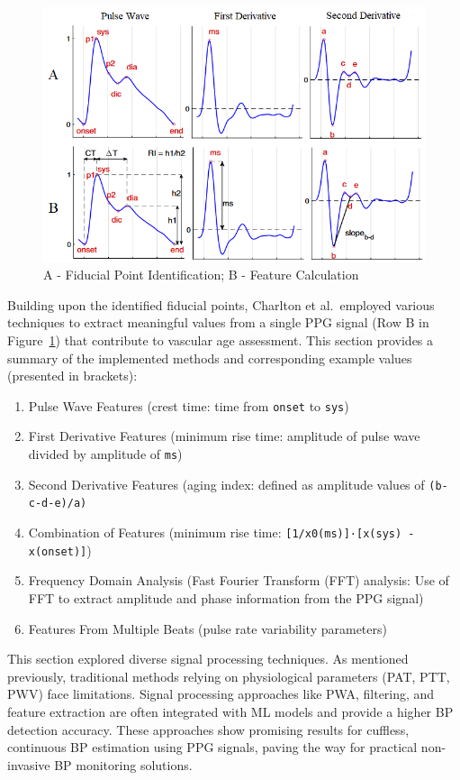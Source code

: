\begin{figure}[h]
    \centering
    \includegraphics[scale=0.8]{images/sp/fiducials}
    \caption{A - Fiducial Point Identification; B - Feature Calculation~\cite{charltonAssessingHemodynamicsPhotoplethysmogram2022}}
    \label{fig:fiducials}
\end{figure}

Building upon the identified fiducial points, Charlton et al.\ employed various techniques to extract meaningful values from a single PPG signal (Row B in Figure~\ref{fig:fiducials}) that contribute to vascular age assessment.
This section provides a summary of the implemented methods and corresponding example values (presented in brackets):
\begin{enumerate}
    \item Pulse Wave Features (crest time: time from \texttt{onset} to \texttt{sys})
    \item First Derivative Features (minimum rise time: amplitude of pulse wave divided by amplitude of \texttt{ms})
    \item Second Derivative Features (aging index: defined as amplitude values of \mbox{\texttt{(b-c-d-e)/a)}}
    \item Combination of Features (minimum rise time: \texttt{[1/x0(ms)]·[x(sys) - x(onset)]})
    \item Frequency Domain Analysis (Fast Fourier Transform (FFT) analysis: Use of FFT to extract amplitude and phase information from the PPG signal)
    \item Features From Multiple Beats (pulse rate variability parameters)
\end{enumerate}

\vspace{0.2cm}
This section explored diverse signal processing techniques.
As mentioned previously, traditional methods relying on physiological parameters (PAT, PTT, PWV) face limitations.
Signal processing approaches like PWA, filtering, and feature extraction are often integrated with ML models and provide a higher BP detection accuracy.
These approaches show promising results for cuffless, continuous BP estimation using PPG signals, paving the way for practical non-invasive BP monitoring solutions.

